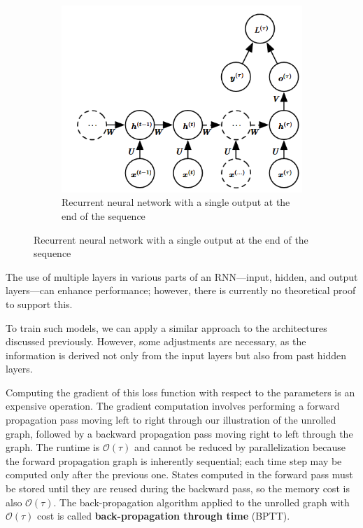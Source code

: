 \begin{figure}[!ht]
\begin{subfigure}[b]{0.3\textwidth}
        \centering
        \includegraphics[width=\linewidth]{img/RNN/RNN2.png}
        \caption{Recurrent neural network with a single output at the end of the sequence}
        \label{fig:rnn2}
    \end{subfigure}
\end{figure}

The use of multiple layers in various parts of an RNN—input, hidden, and output
layers—can enhance performance; however, there is currently no theoretical proof
to support this.

To train such models, we can apply a similar approach to the architectures discussed
previously. However, some adjustments are necessary, as the information is derived
not only from the input layers but also from past hidden layers.

Computing the gradient of this loss function with respect to the parameters is an
expensive operation. The gradient computation involves performing a forward
propagation pass moving left to right through our illustration of the unrolled
graph, followed by a backward propagation pass moving right to left through
the graph. The runtime is $\mathcal{O}(\tau)$ and cannot be reduced by parallelization
because the forward propagation graph is inherently sequential; each time step
may be computed only after the previous one. States computed in the forward pass
must be stored until they are reused during the backward pass, so the memory cost
is also $\mathcal{O}(\tau)$. The back-propagation algorithm applied to the unrolled
graph with $\mathcal{O}(\tau)$ cost is called \textbf{back-propagation through time} (BPTT).

